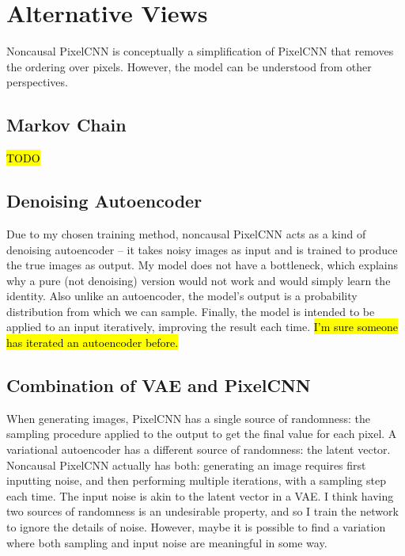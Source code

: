 \documentclass[10pt,a4paper]{article}
\begin{document}
\section{Alternative Views}

Noncausal PixelCNN is conceptually a simplification of PixelCNN that removes the ordering over pixels. However, the model can be understood from other perspectives.

\subsection{Markov Chain}

\hl{TODO}

\subsection{Denoising Autoencoder}

Due to my chosen training method, noncausal PixelCNN acts as a kind of denoising autoencoder \cite{denoisingautoencoder, stackeddenoising} -- it takes noisy images as input and is trained to produce the true images as output. My model does not have a bottleneck, which explains why a pure (not denoising) version would not work and would simply learn the identity. Also unlike an autoencoder, the model's output is a probability distribution from which we can sample. Finally, the model is intended to be applied to an input iteratively, improving the result each time. \hl{I'm sure someone has iterated an autoencoder before.}

\subsection{Combination of VAE and PixelCNN}

When generating images, PixelCNN has a single source of randomness: the sampling procedure applied to the output to get the final value for each pixel. A variational autoencoder \cite{vae} has a different source of randomness: the latent vector. Noncausal PixelCNN actually has both: generating an image requires first inputting noise, and then performing multiple iterations, with a sampling step each time. The input noise is akin to the latent vector in a VAE. I think having two sources of randomness is an undesirable property, and so I train the network to ignore the details of noise. However, maybe it is possible to find a variation where both sampling and input noise are meaningful in some way.
\end{document}
